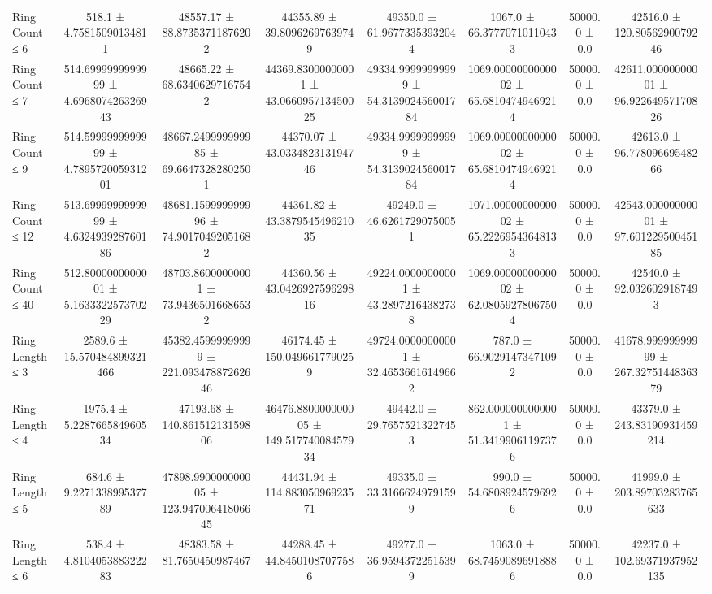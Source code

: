\begin{table}[H]
\begin{tabular}{l c c c c c c c}
        Ring Count ≤ 6 & 518.1 ± 4.75815090134811 & 48557.17 ± 88.87353711876202 & 44355.89 ± 39.80962697639749 & 49350.0 ± 61.96773353932044 & 1067.0 ± 66.37770710110433 & 50000.0 ± 0.0 & 42516.0 ± 120.8056290079246 \\
        Ring Count ≤ 7 & 514.6999999999999 ± 4.696807426326943 & 48665.22 ± 68.63406297167542 & 44369.83000000001 ± 43.066095713450025 & 49334.99999999999 ± 54.313902456001784 & 1069.0000000000002 ± 65.68104749469214 & 50000.0 ± 0.0 & 42611.00000000001 ± 96.92264957170826 \\
        Ring Count ≤ 9 & 514.5999999999999 ± 4.789572005931201 & 48667.249999999985 ± 69.66473282802501 & 44370.07 ± 43.033482313194746 & 49334.99999999999 ± 54.313902456001784 & 1069.0000000000002 ± 65.68104749469214 & 50000.0 ± 0.0 & 42613.0 ± 96.77809669548266 \\
        Ring Count ≤ 12 & 513.6999999999999 ± 4.632493928760186 & 48681.159999999996 ± 74.90170492051682 & 44361.82 ± 43.387954549621035 & 49249.0 ± 46.62617290750051 & 1071.0000000000002 ± 65.22269543648133 & 50000.0 ± 0.0 & 42543.00000000001 ± 97.60122950045185 \\
        Ring Count ≤ 40 & 512.8000000000001 ± 5.163332257370229 & 48703.86000000001 ± 73.94365016686532 & 44360.56 ± 43.042692759629816 & 49224.00000000001 ± 43.28972164382738 & 1069.0000000000002 ± 62.08059278067504 & 50000.0 ± 0.0 & 42540.0 ± 92.0326029187493 \\
        Ring Length ≤ 3 & 2589.6 ± 15.570484899321466 & 45382.45999999999 ± 221.09347887262646 & 46174.45 ± 150.0496617790259 & 49724.00000000001 ± 32.46536616149662 & 787.0 ± 66.90291473471092 & 50000.0 ± 0.0 & 41678.99999999999 ± 267.3275144836379 \\
        Ring Length ≤ 4 & 1975.4 ± 5.228766584960534 & 47193.68 ± 140.86151213159806 & 46476.880000000005 ± 149.51774008457934 & 49442.0 ± 29.76575213227453 & 862.0000000000001 ± 51.34199061197376 & 50000.0 ± 0.0 & 43379.0 ± 243.83190931459214 \\
        Ring Length ≤ 5 & 684.6 ± 9.227133899537789 & 47898.990000000005 ± 123.94700641806645 & 44431.94 ± 114.88305096923571 & 49335.0 ± 33.31666249791599 & 990.0 ± 54.68089245796926 & 50000.0 ± 0.0 & 41999.0 ± 203.89703283765633 \\
        Ring Length ≤ 6 & 538.4 ± 4.810405388322283 & 48383.58 ± 81.7650450987467 & 44288.45 ± 44.84501087077586 & 49277.0 ± 36.95943722515399 & 1063.0 ± 68.74590896918886 & 50000.0 ± 0.0 & 42237.0 ± 102.69371937952135 \\

\end{tabular}
\end{table}
